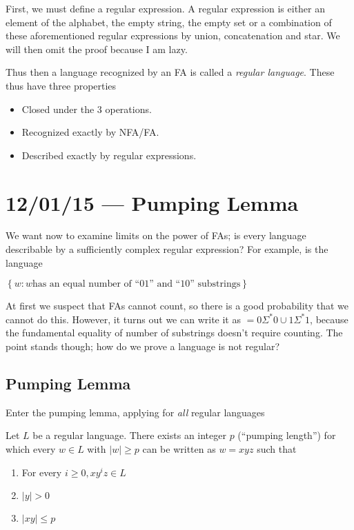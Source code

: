 \documentclass[10pt]{report}
\newcommand{\abs}[1]{\left|#1\right|}
\begin{document}
First, we must define a regular expression. A regular expression is either an element of the alphabet, the empty string, the empty set or a combination of these aforementioned regular expressions by union, concatenation and star. We will then omit the proof because I am lazy.

Thus then a language recognized by an FA is called a \emph{regular language}. These thus have three properties
\begin{itemize}
    \item Closed under the 3 operations.
    \item Recognized exactly by NFA/FA.
    \item Described exactly by regular expressions.
\end{itemize}

\chapter{12/01/15 --- Pumping Lemma}

We want now to examine limits on the power of FAs; is every language describable by a sufficiently complex regular expression? For example, is the language
\begin{center}
    $\left\{ w: w \text{has an equal number of ``01'' and ``10'' substrings} \right\}$
\end{center}

At first we suspect that FAs cannot count, so there is a good probability that we cannot do this. However, it turns out we can write it as $=0\Sigma^*0 \cup 1 \Sigma^* 1$, because the fundamental equality of number of substrings doesn't require counting. The point stands though; how do we prove a language is not regular?

\section{Pumping Lemma}

Enter the pumping lemma, applying for \emph{all} regular languages
\begin{center}
    Let $L$ be a regular language. There exists an integer $p$ (``pumping length'') for which every $w \in L$ with $\abs{w} \geq p$ can be written as $w = xyz$ such that
    \begin{enumerate}[(1)]
        \item For every $i \geq 0, xy^i z \in L$
        \item $\abs{y} > 0$
        \item $\abs{xy} \leq p$
    \end{enumerate}
\end{center}
\end{document}
